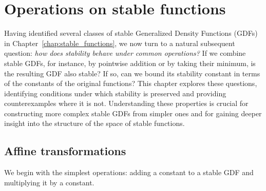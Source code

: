 \chapter{Operations on stable functions}
\label{chap:operations}

Having identified several classes of stable Generalized Density Functions (GDFs)
in Chapter~\ref{chap:stable_functions}, we now turn to a natural subsequent
question: \emph{how does stability behave under common operations?}
If we combine stable GDFs, for instance, by pointwise addition or by taking
their minimum, is the resulting GDF also stable? If so, can we bound its
stability constant in terms of the constants of the original functions? This
chapter explores these questions, identifying conditions under which stability
is preserved and providing counterexamples where it is not. Understanding these
properties is crucial for constructing more complex stable GDFs from simpler
ones and for gaining deeper insight into the structure of the space of stable
functions.

\section{Affine transformations}

We begin with the simplest operations: adding a constant to a stable GDF and
multiplying it by a constant.

